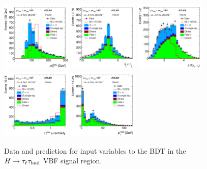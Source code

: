 \begin{figure}[tp]
  \includegraphics[width=0.30\textwidth]{figures/HIGG-2013-32/figaux_06d}
  \includegraphics[width=0.30\textwidth]{figures/HIGG-2013-32/figaux_06e}
  \includegraphics[width=0.30\textwidth]{figures/HIGG-2013-32/figaux_06f}
  \includegraphics[width=0.30\textwidth]{figures/HIGG-2013-32/figaux_07a}
  \includegraphics[width=0.30\textwidth]{figures/HIGG-2013-32/figaux_07b}
  \caption{Data and prediction for input variables to the BDT in the $H\rightarrow\tau_\ell\tau_\text{had}$ VBF signal region.}
  \label{fig:results-SR-inputs}
\end{figure}

